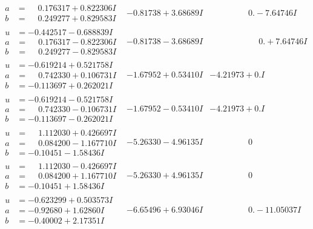 \documentclass[1p]{elsarticle_modified}
\theoremstyle{definition}
\begin{document}
$$\begin{array}{c|c|c}
\begin{aligned}
a &= \phantom{-}0.176317 + 0.822306 I \\
b &= \phantom{-}0.249277 + 0.829583 I\end{aligned}
 & -0.81738 + 3.68689 I & \phantom{-0.000000 } 0. - 7.64746 I \\ \hline\begin{aligned}
u &= -0.442517 - 0.688839 I \\
a &= \phantom{-}0.176317 - 0.822306 I \\
b &= \phantom{-}0.249277 - 0.829583 I\end{aligned}
 & -0.81738 - 3.68689 I & \phantom{-0.000000 -}0. + 7.64746 I \\ \hline\begin{aligned}
u &= -0.619214 + 0.521758 I \\
a &= \phantom{-}0.742330 + 0.106731 I \\
b &= -0.113697 + 0.262021 I\end{aligned}
 & -1.67952 + 0.53410 I & -4.21973 + 0. I\phantom{ +0.000000I} \\ \hline\begin{aligned}
u &= -0.619214 - 0.521758 I \\
a &= \phantom{-}0.742330 - 0.106731 I \\
b &= -0.113697 - 0.262021 I\end{aligned}
 & -1.67952 - 0.53410 I & -4.21973 + 0. I\phantom{ +0.000000I} \\ \hline\begin{aligned}
u &= \phantom{-}1.112030 + 0.426697 I \\
a &= \phantom{-}0.084200 - 1.167710 I \\
b &= -0.10451 - 1.58436 I\end{aligned}
 & -5.26330 - 4.96135 I & \phantom{-0.000000 } 0 \\ \hline\begin{aligned}
u &= \phantom{-}1.112030 - 0.426697 I \\
a &= \phantom{-}0.084200 + 1.167710 I \\
b &= -0.10451 + 1.58436 I\end{aligned}
 & -5.26330 + 4.96135 I & \phantom{-0.000000 } 0 \\ \hline\begin{aligned}
u &= -0.623299 + 0.503573 I \\
a &= -0.92680 + 1.62860 I \\
b &= -0.40002 + 2.17351 I\end{aligned}
 & -6.65496 + 6.93046 I & \phantom{-0.000000 } 0. - 11.05037 I \\ \hline\begin{aligned}

\end{aligned}
\end{array}$$
\end{document}
